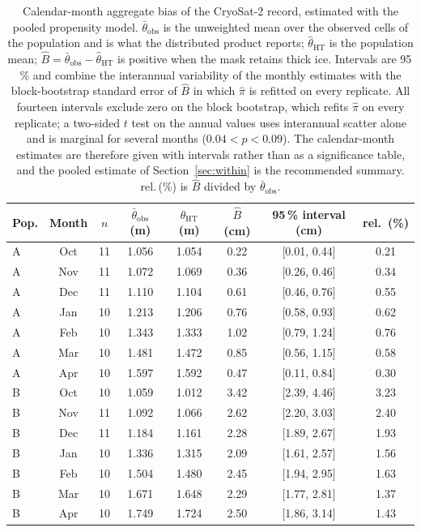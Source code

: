 ﻿\begin{table}[htbp]
\centering
\caption{Calendar-month aggregate bias of the CryoSat-2 record, estimated with
the pooled propensity model. $\bar\theta_{\mathrm{obs}}$ is the unweighted mean
over the observed cells of the population and is what the distributed product
reports; $\hat\theta_{\mathrm{HT}}$ is the population mean;
$\hat B=\bar\theta_{\mathrm{obs}}-\hat\theta_{\mathrm{HT}}$ is positive when the
mask retains thick ice. Intervals are 95\,\% and combine the interannual
variability of the monthly estimates with the block-bootstrap standard error of
$\hat B$ in which $\hat\pi$ is refitted on every replicate. All fourteen
intervals exclude zero on the block bootstrap, which refits $\hat\pi$ on every
replicate; a two-sided $t$ test on the annual values uses interannual scatter
alone and is marginal for several months ($0.04<p<0.09$). The calendar-month
estimates are therefore given with intervals rather than as a significance
table, and the pooled estimate of Section~\ref{sec:within} is the recommended
summary. rel.\,(\%) is $\hat B$ divided by $\bar\theta_{\mathrm{obs}}$.}
\label{tab:monthly}
\footnotesize
\begin{tabular}{lccccccc}
\toprule
Pop. & Month & $n$ & $\bar\theta_{\mathrm{obs}}$ (m) & $\hat\theta_{\mathrm{HT}}$ (m) &
$\hat B$ (cm) & 95\,\% interval (cm) & rel.\ (\%) \\
\midrule
A & Oct & 11 & 1.056 & 1.054 & 0.22 & [0.01, 0.44] & 0.21 \\
A & Nov & 11 & 1.072 & 1.069 & 0.36 & [0.26, 0.46] & 0.34 \\
A & Dec & 11 & 1.110 & 1.104 & 0.61 & [0.46, 0.76] & 0.55 \\
A & Jan & 10 & 1.213 & 1.206 & 0.76 & [0.58, 0.93] & 0.62 \\
A & Feb & 10 & 1.343 & 1.333 & 1.02 & [0.79, 1.24] & 0.76 \\
A & Mar & 10 & 1.481 & 1.472 & 0.85 & [0.56, 1.15] & 0.58 \\
A & Apr & 10 & 1.597 & 1.592 & 0.47 & [0.11, 0.84] & 0.30 \\
\midrule
B & Oct & 10 & 1.059 & 1.012 & 3.42 & [2.39, 4.46] & 3.23 \\
B & Nov & 11 & 1.092 & 1.066 & 2.62 & [2.20, 3.03] & 2.40 \\
B & Dec & 11 & 1.184 & 1.161 & 2.28 & [1.89, 2.67] & 1.93 \\
B & Jan & 10 & 1.336 & 1.315 & 2.09 & [1.61, 2.57] & 1.56 \\
B & Feb & 10 & 1.504 & 1.480 & 2.45 & [1.94, 2.95] & 1.63 \\
B & Mar & 10 & 1.671 & 1.648 & 2.29 & [1.77, 2.81] & 1.37 \\
B & Apr & 10 & 1.749 & 1.724 & 2.50 & [1.86, 3.14] & 1.43 \\
\bottomrule
\end{tabular}
\end{table}
